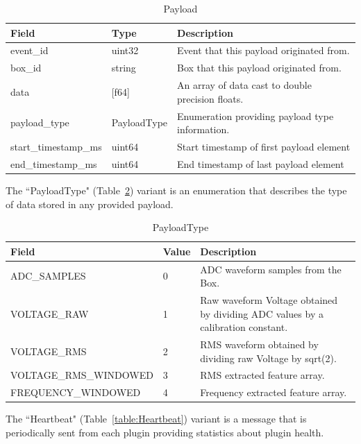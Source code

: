 \begin{table}[H]
	\centering
	\caption{Payload}
	\begin{tabularx}{\textwidth}{llX}
		\toprule
		\textbf{Field} & \textbf{Type} & \textbf{Description} \\
		\midrule
		event\_id & uint32 & Event that this payload originated from.  \\
		box\_id & string & Box that this payload originated from. \\
		data & [f64] & An array of data cast to double precision floats. \\
		payload\_type & PayloadType & Enumeration providing payload type information. \\
		start\_timestamp\_ms & uint64 & Start timestamp of first payload element \\
		end\_timestamp\_ms & uint64 & End timestamp of last payload element\\
		\bottomrule
	\end{tabularx}
	\label{table:Payload}
\end{table}

The ``PayloadType" (Table~\ref{table:PayloadType}) variant is an enumeration that describes the type of data stored in any provided payload.

\begin{table}[H]
	\centering
	\caption{PayloadType}
	\begin{tabularx}{\textwidth}{XlX}
		\toprule
		\textbf{Field} & \textbf{Value} & \textbf{Description} \\
		\midrule
		ADC\_SAMPLES & 0 & ADC waveform samples from the Box.  \\
		VOLTAGE\_RAW & 1 & Raw waveform Voltage obtained by dividing ADC values by a calibration constant. \\
		VOLTAGE\_RMS & 2 & RMS waveform obtained by dividing raw Voltage by sqrt(2). \\
		VOLTAGE\_RMS\_WINDOWED & 3 & RMS extracted feature array. \\
		FREQUENCY\_WINDOWED & 4 & Frequency extracted feature array. \\
		\bottomrule
	\end{tabularx}
	\label{table:PayloadType}
\end{table}

The ``Heartbeat" (Table~\ref{table:Heartbeat}) variant is a message that is periodically sent from each plugin providing statistics about plugin health.

